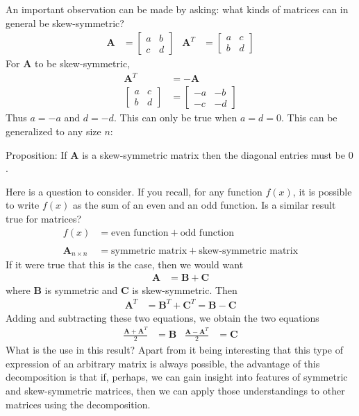 \documentclass[11pt]{article}
\newcommand{\mat}[1]{\mathbf{#1}}
\begin{document}
An important observation can be made by asking: what kinds of matrices can in general be skew-symmetric?
\begin{align*}
\mat{A} &= \begin{bmatrix}a & b \\ c & d\end{bmatrix}
&
\mat{A}^T &= \begin{bmatrix}a & c \\ b & d\end{bmatrix}
\end{align*}
For $\mat{A}$ to be skew-symmetric,
\begin{align*}
\mat{A}^T &= -\mat{A}
\\
\begin{bmatrix}a & c \\ b & d\end{bmatrix}
&=
\begin{bmatrix}-a & -b \\ -c & -d\end{bmatrix}
\end{align*}
Thus $a = -a$ and $d = -d$. This can only be true when $a = d = 0$. This can be generalized to any size $n$:

Proposition: If $\mat{A}$ is a skew-symmetric matrix then the diagonal entries must be $0$.


Here is a question to consider. If you recall, for any function $f(x)$, it is possible to write $f(x)$ as the sum of an even and an odd function. Is a similar result true for matrices?
\begin{align*}
f(x) &= \text{even function} + \text{odd function}
\\
\\
\mat{A}_{n \times n} &= \text{symmetric matrix} + \text{skew-symmetric matrix}
\end{align*}
If it were true that this is the case, then we would want
\begin{align*}
\mat{A} &= \mat{B} + \mat{C}
\end{align*}
where $\mat{B}$ is symmetric and $\mat{C}$ is skew-symmetric. Then
\begin{align*}
\mat{A}^T &= \mat{B}^T + \mat{C}^T = \mat{B} - \mat{C}
\end{align*}
Adding and subtracting these two equations, we obtain the two equations
\begin{align*}
\frac{\mat{A} + \mat{A}^T}{2} &= \mat{B}
&
\frac{\mat{A} - \mat{A}^T}{2} &= \mat{C}
\end{align*}
What is the use in this result? Apart from it being interesting that this type of expression of an arbitrary matrix is always possible, the advantage of this decomposition is that if, perhaps, we can gain insight into features of symmetric and skew-symmetric matrices, then we can apply those understandings to other matrices using the decomposition.
\end{document}
